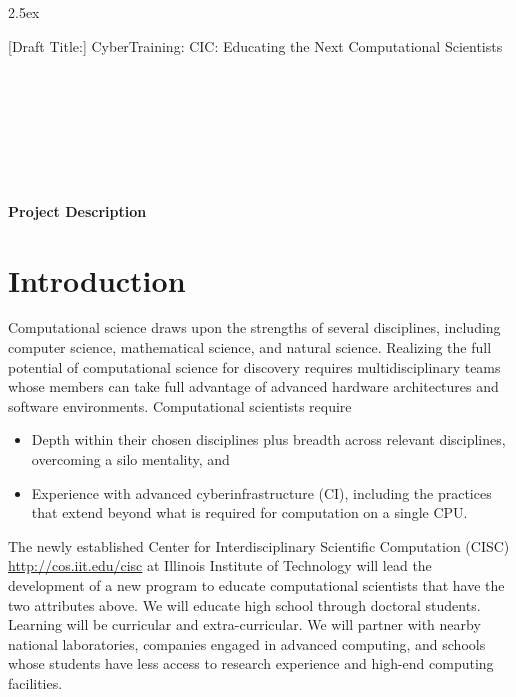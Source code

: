 \documentclass[11pt]{NSFamsart}
\begin{document}
\leftmargini2.5ex %

[Draft Title:]  	CyberTraining: CIC:  Educating the Next Computational Scientists

\noindent
{}\\
 \\
 \\
 \\
\\
\\



\bigskip


\bigskip

\centerline{\Large \textbf{Project Description}}
\vspace{-2ex}

\setcounter{tocdepth}{2}
\tableofcontents %

\vspace{-6ex}

\section{Introduction}
Computational science draws upon the strengths of several disciplines, including computer science, mathematical science, and natural science.  Realizing the full potential of computational science for discovery requires multidisciplinary teams whose members can take full advantage of advanced hardware architectures and software environments.  Computational scientists require

\begin{itemize}
\item Depth within their chosen disciplines plus breadth across relevant disciplines, overcoming a silo mentality, and
\item Experience with advanced cyberinfrastructure (CI), including the practices that extend beyond what is required for computation on a single CPU.
\end{itemize}

The newly established Center for Interdisciplinary Scientific Computation (CISC) \url{http://cos.iit.edu/cisc} at Illinois Institute of Technology will lead the development of a new program to educate computational scientists that have the two attributes above.  We will educate high school through doctoral students.  Learning will be curricular and extra-curricular.  We will partner with nearby national laboratories, companies engaged in advanced computing, and schools whose students have less access to research experience and high-end computing facilities.
\end{document}
